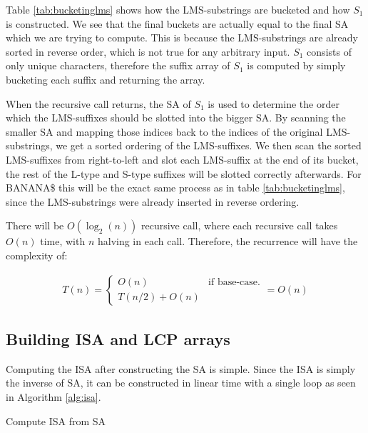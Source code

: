 Table \ref{tab:bucketinglms} shows how the LMS-substrings are bucketed and how $S_1$ is
constructed. We see that the final buckets are actually equal to the final SA which we are
trying to compute. This is because the LMS-substrings are already sorted in reverse order,
which is not true for any arbitrary input. $S_1$ consists of only unique characters,
therefore the suffix array of $S_1$ is computed by simply bucketing each suffix and
returning the array.

When the recursive call returns, the SA of $S_1$ is used to determine the order which the
LMS-suffixes should be slotted into the bigger SA. By scanning the smaller SA and mapping
those indices back to the indices of the original LMS-substrings, we get a sorted ordering
of the LMS-suffixes. We then scan the sorted LMS-suffixes from right-to-left and slot each
LMS-suffix at the end of its bucket, the rest of the L-type and S-type suffixes will be
slotted correctly afterwards. For BANANA\$ this will be the exact same process as in table
\ref{tab:bucketinglms}, since the LMS-substrings were already inserted in reverse
ordering.

There will be $O(\log_2(n))$ recursive call, where each recursive call takes $O(n)$ time,
with $n$ halving in each call. Therefore, the recurrence will have the complexity of:

\begin{gather*}
    T(n) =
\begin{cases}
    O(n) & \text{if base-case.} \\
    T(n / 2) + O(n)
\end{cases}
= O(n)
\end{gather*}

\subsection*{Building ISA and LCP arrays}

Computing the ISA after constructing the SA is simple. Since the ISA is simply the inverse
of SA, it can be constructed in linear time with a single loop as seen in Algorithm
\ref{alg:isa}.

\begin{algorithm}[t]
  \SetAlgoLined\DontPrintSemicolon

  \vspace{0.5cm}
  \caption{Compute ISA from SA}
  \label{alg:isa}
\end{algorithm}


